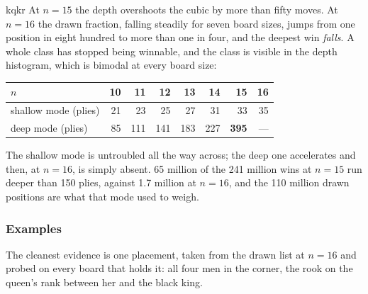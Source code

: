 \documentclass[10pt]{article}
\begin{document}
\begin{result}[title={And then the win disappears}]{kqkr}
At $n=15$ the depth overshoots the cubic by more than fifty moves. At $n=16$
the drawn fraction, falling steadily for seven board sizes, jumps from one
position in eight hundred to more than one in four, and the deepest win
\emph{falls}. A whole class has stopped being winnable, and the class is
visible in the depth histogram, which is bimodal at every board size:

\smallskip
\begin{center}\small
\begin{tabular}{@{}lrrrrrrr@{}}
\toprule
$n$ & 10 & 11 & 12 & 13 & 14 & 15 & 16 \\
\midrule
shallow mode (plies) & 21 & 23 & 25 & 27 & 31 & 33 & 35 \\
deep mode (plies)    & 85 & 111 & 141 & 183 & 227 & \textbf{395} & --- \\
\bottomrule
\end{tabular}
\end{center}

\smallskip
The shallow mode is untroubled all the way across; the deep one accelerates and
then, at $n=16$, is simply absent. 65 million of the 241 million wins at $n=15$
run deeper than 150 plies, against 1.7 million at $n=16$, and the 110 million
drawn positions are what that mode used to weigh.
\label{sub:kqkr-vanish}
\end{result}

\subsubsection{Examples}\label{sub:kqkr-oneposition}

\noindent
The cleanest evidence is one placement, taken from the drawn list at $n=16$ and
probed on every board that holds it: all four men in the corner, the rook on the
queen's rank between her and the black king.

\medskip
\noindent
{}\hfill
{}\hfill
{}
\end{document}
